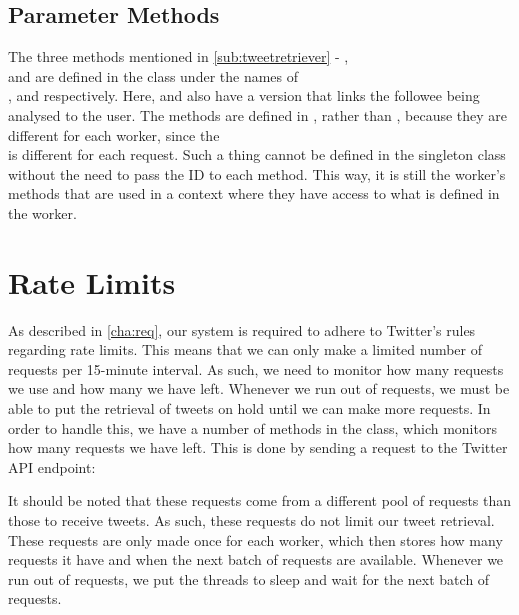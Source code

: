 \subsection{Parameter Methods}
The three methods mentioned in \autoref{sub:tweetretriever} -
,  \\and {} are defined in
the  class under the names of \\,
 and  respectively. Here,
 and  also have a version
that links the followee being analysed to the user. The methods are defined
in , rather than , because they are
different for each worker, since the \\ is different for
each request. Such a thing cannot be defined in the singleton class without the
need to pass the ID to each method. This way, it is still the worker's methods
that are used in a context where they have access to what is defined in the
worker.

\section{Rate Limits}\label{sec:rateLimit}
As described in \autoref{cha:req}, our system is required to adhere to Twitter's
rules regarding rate limits. This means that we can only make a limited number of
requests per 15-minute interval. As such, we need to monitor how many requests
we use and how many we have left. Whenever we run out of requests, we must
be able to put the retrieval of tweets on hold until we can make more requests.
In order to handle this, we have a number of methods in the 
class, which monitors how many requests we have left. This is done by sending a
request to the Twitter \ac{API} endpoint: \nl

 \nl

It should be noted that these requests come from a different pool of requests
than those to receive tweets. As such, these requests do not limit our tweet
retrieval. These requests are only made once for each worker, which then stores
how many requests it have and when the next batch of requests are available.
Whenever we run out of requests, we put the threads to sleep and wait for the
next batch of requests.











